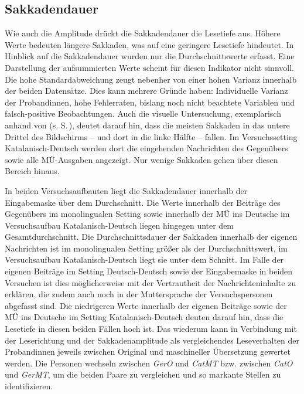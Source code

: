 \subsection{Sakkadendauer}\label{K7:para:sacdur}
Wie auch die Amplitude drückt die Sakkadendauer die Lesetiefe aus. Höhere Werte bedeuten längere Sakkaden, was auf eine geringere Lesetiefe hindeutet. In Hinblick auf die Sakkadendauer wurden nur die Durchschnittswerte erfasst. Eine Darstellung der aufsummierten Werte scheint für diesen Indikator nicht sinnvoll. Die hohe Standardabweichung zeugt nebenher von einer hohen Varianz innerhalb der beiden Datensätze. Dies kann mehrere Gründe haben: Individuelle Varianz der Proband{\textperiodcentered}innen, hohe Fehlerraten, bislang noch nicht beachtete Variablen und falsch-positive Beobachtungen. Auch die visuelle Untersuchung, exemplarisch anhand von  (s. S.\,\pageref{K6:fig:sacmove-TN24}), deutet darauf hin, dass die meisten Sakkaden in das untere Drittel des Bildschirms -- und dort in die linke Hälfte -- fallen. Im Versuchssetting Katalanisch-Deutsch werden dort die eingehenden Nachrichten des Gegenübers sowie alle MÜ-Ausgaben angezeigt. Nur wenige Sakkaden gehen über diesen Bereich hinaus.

In beiden Versuchsaufbauten liegt die Sakkadendauer innerhalb der Eingabemaske über dem Durchschnitt. Die Werte innerhalb der Beiträge des Gegenübers im monolingualen Setting sowie innerhalb der MÜ ins Deutsche im Versuchsaufbau Katalanisch-Deutsch liegen hingegen unter dem Gesamtdurchschnitt. Die Durchschnittsdauer der Sakkaden innerhalb der eigenen Nachrichten ist im monolingualen Setting größer als der Durchschnittswert, im Versuchsaufbau Ka\-ta\-la\-nisch-Deutsch liegt sie unter dem Schnitt. Im Falle der eigenen Beiträge im Setting Deutsch-Deutsch sowie der Eingabemaske in beiden Versuchen ist dies möglicherweise mit der Vertrautheit der Nachrichteninhalte zu erklären, die zudem auch noch in der Muttersprache der Versuchspersonen abgefasst sind. Die niedrigeren Werte innerhalb der eigenen Beiträge sowie der MÜ ins Deutsche im Setting Katalanisch-Deutsch deuten darauf hin, dass die Lesetiefe in diesen beiden Fällen hoch ist. Das wiederum kann in Verbindung mit der Leserichtung und der Sakkadenamplitude als vergleichendes Leseverhalten der Proband{\textperiodcentered}innen jeweils zwischen Original und maschineller Übersetzung gewertet werden. Die Personen wechseln zwischen \emph{GerO} und \emph{CatMT} bzw. zwischen \emph{CatO} und \emph{GerMT}, um die beiden Paare zu vergleichen und so markante Stellen zu identifizieren.


